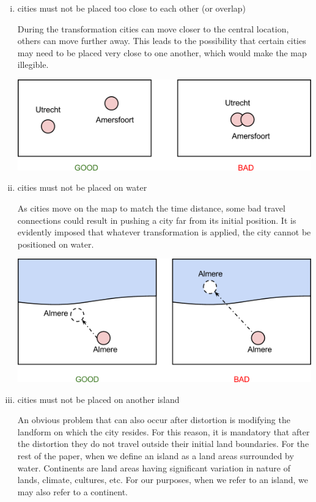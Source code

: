 \documentclass[a4paper,11pt]{article}
\begin{document}
\begin{enumerate}[(i)]
    \item cities must not be placed too close to each other (or overlap)

During the transformation cities can move closer to the central location, others can
move further away. This leads to the possibility that certain cities may need to be placed
very close to one another, which would make the map illegible.

    \begin{center}
        \includegraphics[width=\textwidth]{crit1.png}
    \end{center}

    \item cities must not be placed on water

As cities move on the map to match the time distance, some bad travel connections
could result in pushing a city far from its initial position. It is evidently imposed that whatever
transformation is applied, the city cannot be positioned on water.

    \begin{center}
        \includegraphics[width=\textwidth]{crit2.png}
    \end{center}
    
    \item cities must not be placed on another island

An obvious problem that can also occur after distortion is modifying the landform
on which the city resides. For this reason, it is mandatory that after the distortion they do
not travel outside their initial land boundaries. For the rest of the paper, when we define an
island as a land areas surrounded by water. Continents are land areas having significant
variation in nature of lands, climate, cultures, etc. For our purposes, when we refer to an island, we may also refer to a continent.


\end{enumerate}
\end{document}
